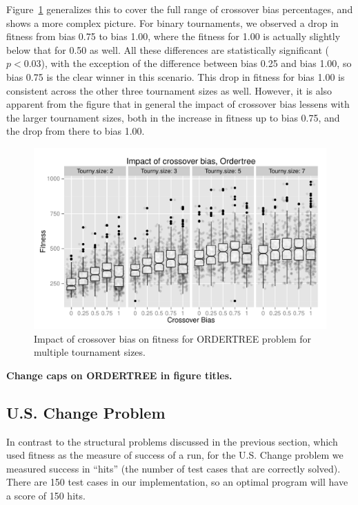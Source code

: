 \documentclass{sig-alternate}
\begin{document}
Figure~\ref{fig:Ordertree_results_all_tournaments_Jan15} generalizes this to cover the full range of 
crossover bias
percentages, and shows a more complex picture. 
For binary tournaments, we observed a drop in fitness from bias 0.75 to bias 1.00, where the fitness for
1.00 is actually slightly below that for 0.50 as well. All these differences are statistically significant ($p <
0.03$), with the exception of the difference between bias 0.25 and bias 1.00, so bias 0.75 is the clear winner in this
scenario. This drop in fitness for bias 1.00
is consistent across the other three tournament sizes as well. However, it is also
apparent from the figure that in general the impact of crossover bias lessens with the larger tournament sizes, both in
the increase in fitness up to bias 0.75, and the drop from there to bias 1.00.

\begin{figure}
\centering
\includegraphics[width=0.45 \textwidth]{Plots/Ordertree_results_all_tournaments_Jan15.pdf}
\caption{Impact of crossover bias on fitness for ORDERTREE problem for multiple tournament sizes.}
\label{fig:Ordertree_results_all_tournaments_Jan15}
\end{figure}

\textbf{Change caps on ORDERTREE in figure titles.}

%
%
%
%

\subsection{U.S. Change Problem}

In contrast to the structural problems discussed in the previous section, which used fitness as the measure of success
of a run, for the U.S. Change problem we measured success in ``hits'' (the number of test cases that are correctly
solved). There are 150 test cases in our implementation, so an optimal program will have a score of 150 hits.
\end{document}
